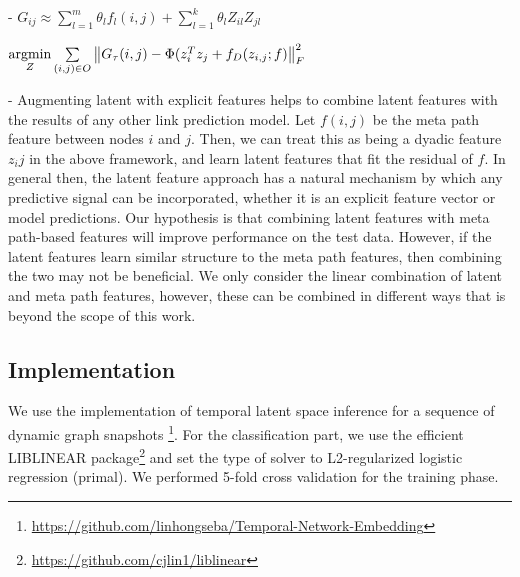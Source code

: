- $G_{ij} \approx  \sum_{l=1}^{m} \theta_l f_l(i,j) + \sum_{l=1}^{k} \theta_l Z_{il}Z_{jl}$

$ \operatorname*{argmin}\limits_{Z} \sum\limits_{(i,j)\in O} \left \| G_\tau(i,j) - \Phi(z_{i}^Tz_{j} + f_D(z_{i,j};f) \right \|^2_F $


- Augmenting latent with explicit features helps to combine latent features with the results of any other link prediction model. Let $f(i,j)$ be the meta path feature between nodes $i$ and $j$. Then, we can treat this as being a dyadic feature $z_ij$ in the above framework, and learn latent features that fit the residual of $f$. In general then, the latent feature approach has a natural mechanism by which any predictive signal can be incorporated, whether it is an explicit feature vector or model predictions. Our hypothesis is that combining latent features with meta path-based features will improve performance on the test data. However, if the latent features learn similar structure to the meta path features, then combining the two may not be beneficial. We only consider the linear combination of latent and meta path features, however, these can be combined in different ways that is beyond the scope of this work.

\subsection{Implementation}

We use the implementation of temporal latent space inference for a sequence of dynamic graph snapshots \footnote{\url{https://github.com/linhongseba/Temporal-Network-Embedding}}\cite{Zhu2016}.
 For the classification part, we use the efficient LIBLINEAR \cite{fan2008liblinear} package\footnote{\url{https://github.com/cjlin1/liblinear}} and set the type of solver to L2-regularized logistic regression (primal). %
We performed 5-fold cross validation for the training phase.



